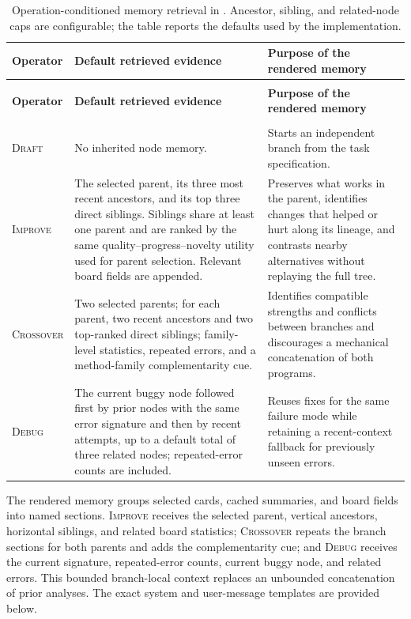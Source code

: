 \begingroup
\footnotesize
\setlength{\tabcolsep}{5pt}
\renewcommand{\arraystretch}{1.12}
\begin{longtable}{@{}>{\raggedright\arraybackslash}p{}>{\raggedright\arraybackslash}p{}>{\raggedright\arraybackslash}p{}@{}}
\caption{Operation-conditioned memory retrieval in \openmleevo{}. Ancestor, sibling, and related-node caps are configurable; the table reports the defaults used by the implementation.}
\label{tab:openmleevo-operation-memory}\\
\toprule
\textbf{Operator} & \textbf{Default retrieved evidence} & \textbf{Purpose of the rendered memory} \\
\midrule
\endfirsthead
\multicolumn{3}{c}{\tablename\ \thetable\ (continued)}\\
\toprule
\textbf{Operator} & \textbf{Default retrieved evidence} & \textbf{Purpose of the rendered memory} \\
\midrule
\endhead
\midrule
\multicolumn{3}{r}{Continued on next page}\\
\endfoot
\bottomrule
\endlastfoot
\textsc{Draft} & No inherited node memory. & Starts an independent branch from the task specification. \\
\textsc{Improve} & The selected parent, its three most recent ancestors, and its top three direct siblings. Siblings share at least one parent and are ranked by the same quality--progress--novelty utility used for parent selection. Relevant board fields are appended. & Preserves what works in the parent, identifies changes that helped or hurt along its lineage, and contrasts nearby alternatives without replaying the full tree. \\
\textsc{Crossover} & Two selected parents; for each parent, two recent ancestors and two top-ranked direct siblings; family-level statistics, repeated errors, and a method-family complementarity cue. & Identifies compatible strengths and conflicts between branches and discourages a mechanical concatenation of both programs. \\
\textsc{Debug} & The current buggy node followed first by prior nodes with the same error signature and then by recent attempts, up to a default total of three related nodes; repeated-error counts are included. & Reuses fixes for the same failure mode while retaining a recent-context fallback for previously unseen errors. \\
\end{longtable}
\endgroup

The rendered memory groups selected cards, cached summaries, and board fields into named sections. \textsc{Improve} receives the selected parent, vertical ancestors, horizontal siblings, and related board statistics; \textsc{Crossover} repeats the branch sections for both parents and adds the complementarity cue; and \textsc{Debug} receives the current signature, repeated-error counts, current buggy node, and related errors. This bounded branch-local context replaces an unbounded concatenation of prior analyses. The exact system and user-message templates are provided below.

